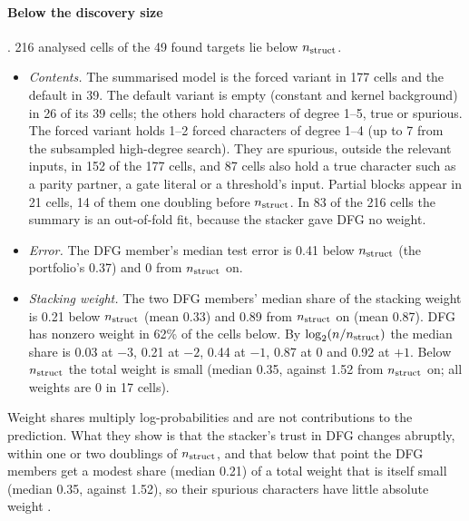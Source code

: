 \paragraph{Below the discovery size} . 216 analysed cells of the 49 found targets lie below $n_{\rm struct}$.
\begin{itemize}
\item \emph{Contents.} The summarised model is the forced variant in 177 cells and the default in 39. The default variant is empty (constant and kernel background) in 26 of its 39 cells; the others hold characters of degree 1--5, true or spurious. The forced variant holds 1--2 forced characters of degree 1--4 (up to 7 from the subsampled high-degree search). They are spurious, outside the relevant inputs, in 152 of the 177 cells, and 87 cells also hold a true character such as a parity partner, a gate literal or a threshold's input. Partial blocks appear in 21 cells, 14 of them one doubling before $n_{\rm struct}$. In 83 of the 216 cells the summary is an out-of-fold fit, because the stacker gave DFG no weight.
\item \emph{Error.} The DFG member's median test error is 0.41 below $n_{\rm struct}$ (the portfolio's 0.37) and 0 from $n_{\rm struct}$ on.
\item \emph{Stacking weight.} The two DFG members' median share of the stacking weight is 0.21 below $n_{\rm struct}$ (mean 0.33) and 0.89 from $n_{\rm struct}$ on (mean 0.87). DFG has nonzero weight in 62\% of the cells below. By $\log_2(n/n_{\rm struct})$ the median share is 0.03 at $-3$, 0.21 at $-2$, 0.44 at $-1$, 0.87 at 0 and 0.92 at $+1$. Below $n_{\rm struct}$ the total weight is small (median 0.35, against 1.52 from $n_{\rm struct}$ on; all weights are 0 in 17 cells).
\end{itemize}
Weight shares multiply log-probabilities and are not contributions to the prediction. What they show is that the stacker's trust in DFG changes abruptly, within one or two doublings of $n_{\rm struct}$, and that below that point the DFG members get a modest share (median 0.21) of a total weight that is itself small (median 0.35, against 1.52), so their spurious characters have little absolute weight .

